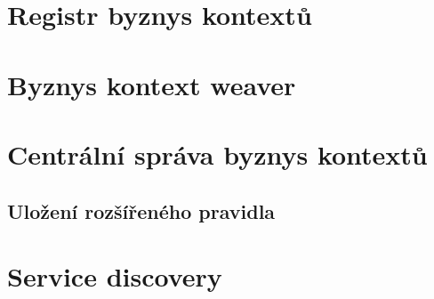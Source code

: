\section{Registr byznys kontextů}

\section{Byznys kontext weaver}

\section{Centrální správa byznys kontextů}

\subsection{Uložení rozšířeného pravidla}


\section{Service discovery}

